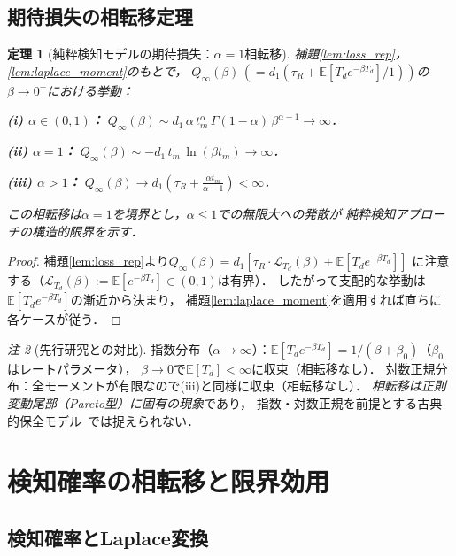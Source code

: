 \documentclass[12pt,a4paper]{article}
\theoremstyle{plain}
\newtheorem{theorem}{定理}[section]
\theoremstyle{definition}
\theoremstyle{remark}
\newtheorem{remark}[theorem]{注}
\newcommand{\E}{\mathbb{E}}
\newcommand{\calL}{\mathcal{L}}
\newcommand{\Qinf}{Q_{\infty}}
\begin{document}
\subsection{期待損失の相転移定理}

\begin{theorem}[純粋検知モデルの期待損失：$\alpha=1$相転移]\label{thm:q_inf}
補題\ref{lem:loss_rep}，\ref{lem:laplace_moment}のもとで，
$\Qinf(\beta)\,(=d_1(\tau_R+\E[T_d e^{-\beta T_d}]/1))$の
$\beta\to0^+$における挙動：

\noindent\textbf{(i) $\alpha\in(0,1)$：}
$\Qinf(\beta)\sim d_1\,\alpha\,t_m^\alpha\,\Gamma(1-\alpha)\,\beta^{\alpha-1}\to\infty$．

\noindent\textbf{(ii) $\alpha=1$：}
$\Qinf(\beta)\sim -d_1\,t_m\,\ln(\beta t_m)\to\infty$．

\noindent\textbf{(iii) $\alpha>1$：}
$\Qinf(\beta)\to d_1\left(\tau_R+\frac{\alpha t_m}{\alpha-1}\right)<\infty$．

この相転移は$\alpha=1$を境界とし，$\alpha\le1$での無限大への発散が
純粋検知アプローチの構造的限界を示す．
\end{theorem}

\begin{proof}
補題\ref{lem:loss_rep}より$\Qinf(\beta)=d_1[\tau_R\cdot\calL_{T_d}(\beta)+\E[T_d e^{-\beta T_d}]]$
に注意する（$\calL_{T_d}(\beta):=\E[e^{-\beta T_d}]\in(0,1)$は有界）．
したがって支配的な挙動は$\E[T_d e^{-\beta T_d}]$の漸近から決まり，
補題\ref{lem:laplace_moment}を適用すれば直ちに各ケースが従う．
\end{proof}

\begin{remark}[先行研究との対比]
指数分布（$\alpha\to\infty$）：$\E[T_d e^{-\beta T_d}]=1/(\beta+\beta_0)$（$\beta_0$はレートパラメータ），
$\beta\to0$で$\E[T_d]<\infty$に収束（相転移なし）．
対数正規分布：全モーメントが有限なので(iii)と同様に収束（相転移なし）．
\emph{相転移は正則変動尾部（Pareto型）に固有の現象}であり，
指数・対数正規を前提とする古典的保全モデル~\cite{barlow1965,nakagawa2005}では捉えられない．
\end{remark}

\section{検知確率の相転移と限界効用}
\label{sec:pe}

\subsection{検知確率とLaplace変換}
\end{document}
